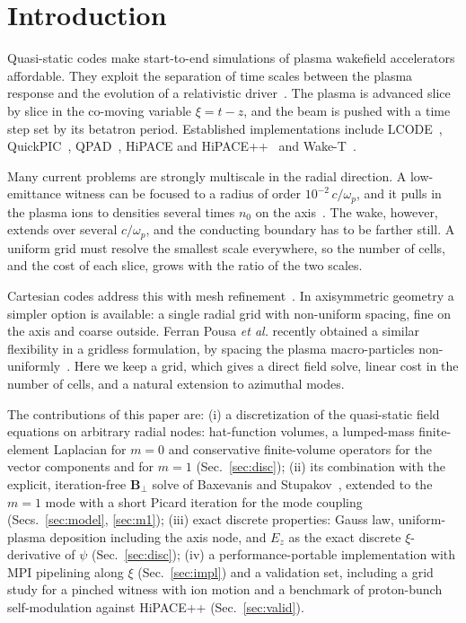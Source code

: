 \documentclass[aps,prab,reprint,floatfix,superscriptaddress,amsmath,amssymb]{revtex4-2}
\begin{document}
\section{Introduction}\label{sec:intro}

Quasi-static codes make start-to-end simulations of plasma wakefield accelerators affordable. They exploit the separation of time scales between the plasma response and the evolution of a relativistic driver~\cite{Mora1997}. The plasma is advanced slice by slice in the co-moving variable $\xi = t - z$, and the beam is pushed with a time step set by its betatron period. Established implementations include LCODE~\cite{Lotov2003,Sosedkin2016}, QuickPIC~\cite{Huang2006,An2013}, QPAD~\cite{Li2021}, HiPACE and HiPACE++~\cite{Mehrling2014,Diederichs2022} and Wake-T~\cite{FerranPousa2026}.

Many current problems are strongly multiscale in the radial direction. A low-emittance witness can be focused to a radius of order $10^{-2}\,c/\omega_p$, and it pulls in the plasma ions to densities several times $n_0$ on the axis~\cite{Rosenzweig2005,An2017}. The wake, however, extends over several $c/\omega_p$, and the conducting boundary has to be farther still. A uniform grid must resolve the smallest scale everywhere, so the number of cells, and the cost of each slice, grows with the ratio of the two scales.

Cartesian codes address this with mesh refinement~\cite{Su2024,HiPACEdoc}. In axisymmetric geometry a simpler option is available: a single radial grid with non-uniform spacing, fine on the axis and coarse outside. Ferran Pousa \textit{et al.} recently obtained a similar flexibility in a gridless formulation, by spacing the plasma macro-particles non-uniformly~\cite{FerranPousa2026}. Here we keep a grid, which gives a direct field solve, linear cost in the number of cells, and a natural extension to azimuthal modes.

The contributions of this paper are:
(i) a discretization of the quasi-static field equations on arbitrary radial nodes: hat-function volumes, a lumped-mass finite-element Laplacian for $m=0$ and conservative finite-volume operators for the vector components and for $m=1$ (Sec.~\ref{sec:disc});
(ii) its combination with the explicit, iteration-free $\bm{B}_\perp$ solve of Baxevanis and Stupakov~\cite{Baxevanis2018}, extended to the $m=1$ mode with a short Picard iteration for the mode coupling (Secs.~\ref{sec:model}, \ref{sec:m1});
(iii) exact discrete properties: Gauss law, uniform-plasma deposition including the axis node, and $E_z$ as the exact discrete $\xi$-derivative of $\psi$ (Sec.~\ref{sec:disc});
(iv) a performance-portable implementation with MPI pipelining along $\xi$ (Sec.~\ref{sec:impl}) and a validation set, including a grid study for a pinched witness with ion motion and a benchmark of proton-bunch self-modulation against HiPACE++ (Sec.~\ref{sec:valid}).
\end{document}
